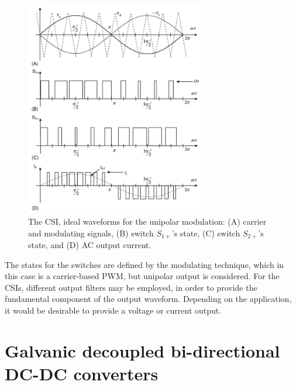 \begin{figure}[!ht]
        \centering
        \includegraphics[width=0.7\textwidth]{EMPC_PNG_Pics/CSIwaves.png}
        \caption{The CSI, ideal waveforms for the unipolar modulation: (A) carrier and modulating signals, (B) switch $S_{1+}$'s state, (C) switch $S_{2+}$'s state, and (D) AC output current.}
        \label{BASICCSR:fig:CSIwave}
    \end{figure}

The states for the switches are defined by the modulating technique, which in this case is a carrier-based PWM, but unipolar output is considered. For the CSIs, different output filters may be employed, in order to provide the fundamental component of the output waveform. Depending on the application, it would be desirable to provide a voltage or current output.

\section{Galvanic decoupled bi-directional DC-DC converters}\label{BASICCSR:sec:DCDC}

